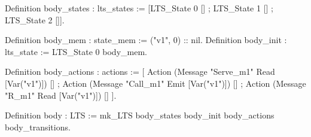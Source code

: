 Definition body_states : lts_states := 
  [LTS_State 0 [] ; LTS_State 1 [] ; LTS_State 2 []].

Definition body_mem : state_mem := ("v1", 0) :: nil.
Definition body_init : lts_state := LTS_State 0 body_mem.

Definition body_actions : actions := 
  [ Action (Message "Serve_m1" Read [Var("v1")]) [] ;
    Action (Message "Call_m1" Emit [Var("v1")]) [] ;
    Action (Message "R_m1" Read [Var("v1")]) []
  ].

Definition body : LTS := 
  mk_LTS body_states body_init body_actions body_transitions.
